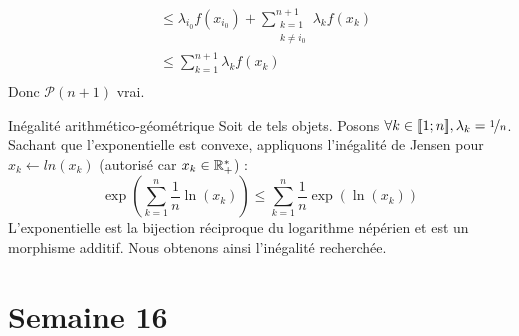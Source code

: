 \documentclass{article}
\renewenvironment{question_kholle}[2][ ]
{
	\subsection{\texorpdfstring{#2}{}}
	\notblank{#1}
	{
		\noindent #1
		\bigbreak
	}
	{}
	\begin{proof}
}
{
	\end{proof}
}
\begin{document}
\begin{question_kholle}
\begin{itemize}[label=*, leftmargin=0.5cm]
\begin{equation*}
\begin{aligned}
					&\leqslant \lambda_{i_0} f(x_{i_0}) + \sum_{\begin{array}{c} k = 1 \\ k \neq i_0 \end{array}}^{n+1} \lambda_k f\left( x_k \right) \\
					&\leqslant \sum_{k = 1}^{n+1} \lambda_k f\left( x_k \right) \\
				\end{aligned}
			\end{equation*}
			Donc $\mathcal{P}(n+1)$ vrai.
		\end{itemize}
	\end{question_kholle}
	
	\begin{question_kholle}
		[Soit $n \in \N^*$. Soit $x \in \R_+^{*n}$.
		\begin{equation}
				\left( \prod_{k=1}^{n} x_k \right)^{\nicefrac{1}{n}}
				\leqslant \frac{1}{n} \sum_{k=1}^{n} x_k
		\end{equation}]
		{Inégalité arithmético-géométrique}
		Soit de tels objets. Posons $\forall k \in [\![1;n]\!], \lambda_k = \nicefrac{1}{n}$. \\
		Sachant que l'exponentielle est convexe, appliquons l'inégalité de Jensen pour $x_k \leftarrow ln(x_k)$ (autorisé car $x_k \in \mathbb R_+^*$) :
		\begin{equation*}
			\exp \left( \sum_{k=1}^{n} \frac{1}{n} \ln \left( x_k \right) \right)
			\leqslant \sum_{k=1}^{n} \frac{1}{n} \exp \left( \ln \left( x_k \right) \right)
		\end{equation*}
		L'exponentielle est la bijection réciproque du logarithme népérien et est un morphisme additif. Nous obtenons ainsi l'inégalité recherchée.
	\end{question_kholle}
\pagebreak\section{Semaine 16}
	
\end{document}
